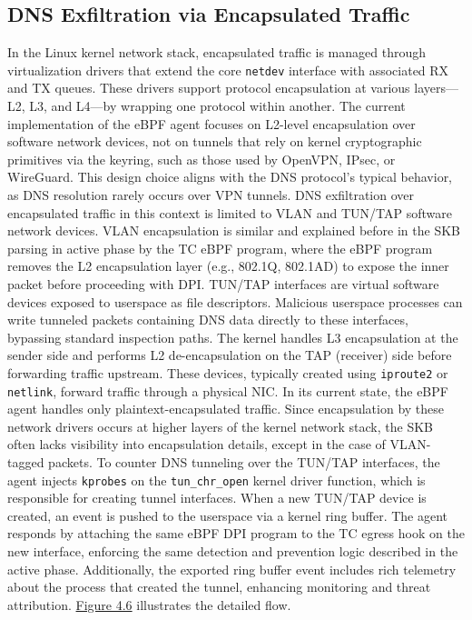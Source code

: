 \documentclass [11pt, proquest] {uwthesis}[2020/02/24]
\begin{document}
\subsection{DNS Exfiltration via Encapsulated Traffic}
In the Linux kernel network stack, encapsulated traffic is managed through virtualization drivers that extend the core \texttt{netdev} interface with associated RX and TX queues. These drivers support protocol encapsulation at various layers—L2, L3, and L4—by wrapping one protocol within another. 
The current implementation of the eBPF agent focuses on L2-level encapsulation over software network devices, not on tunnels that rely on kernel cryptographic primitives via the keyring, such as those used by OpenVPN, IPsec, or WireGuard. This design choice aligns with the DNS protocol’s typical behavior, as DNS resolution rarely occurs over VPN tunnels. DNS exfiltration over encapsulated traffic in this context is limited to VLAN and TUN/TAP software network devices. VLAN encapsulation is similar and explained before in the SKB parsing in active phase by the TC eBPF program, where the eBPF program removes the L2 encapsulation layer (e.g., 802.1Q, 802.1AD) to expose the inner packet before proceeding with DPI.
TUN/TAP interfaces are virtual software devices exposed to userspace as file descriptors. Malicious userspace processes can write tunneled packets containing DNS data directly to these interfaces, bypassing standard inspection paths. The kernel handles L3 encapsulation at the sender side and performs L2 de-encapsulation on the TAP (receiver) side before forwarding traffic upstream. These devices, typically created using \texttt{iproute2} or \texttt{netlink}, forward traffic through a physical NIC. In its current state, the eBPF agent handles only plaintext-encapsulated traffic. Since encapsulation by these network drivers occurs at higher layers of the kernel network stack, the SKB often lacks visibility into encapsulation details, except in the case of VLAN-tagged packets. To counter DNS tunneling over the TUN/TAP interfaces, the agent injects \texttt{kprobes} on the \texttt{tun\_chr\_open} kernel driver function, which is responsible for creating tunnel interfaces. When a new TUN/TAP device is created, an event is pushed to the userspace via a kernel ring buffer. The agent responds by attaching the same eBPF DPI program to the TC egress hook on the new interface, enforcing the same detection and prevention logic described in the active phase. 
Additionally, the exported ring buffer event includes rich telemetry about the process that created the tunnel, enhancing monitoring and threat attribution. \hyperref[sec:data_plane_tunnel_netdev]{Figure 4.6} illustrates the detailed flow.
\end{document}
